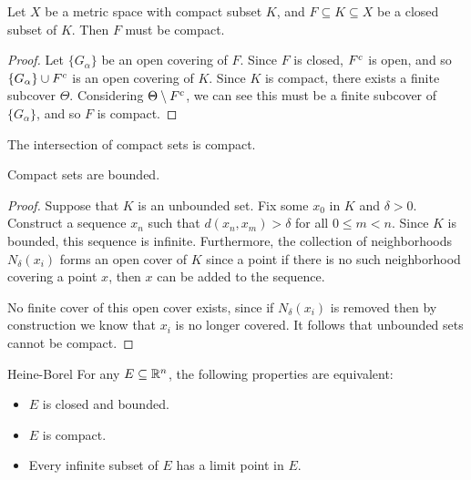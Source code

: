 \begin{thm}\label{thm:closed-subsets-are-compact}
    Let $X$ be a metric space with compact subset $K$, and $F \subseteq K \subseteq X$ be a closed subset of $K$. Then $F$ must be compact.
\end{thm}

\begin{proof}
    Let $\{G_{\alpha}\}$ be an open covering of $F$. Since $F$ is closed, $F^{c}$ is open, and so $\{G_{\alpha}\} \cup F^{c}$ is an open covering of $K$. Since $K$ is compact, there exists a finite subcover $\Theta$. Considering $\Theta \setminus F^{c}$, we can see this must be a finite subcover of $\{G_{\alpha}\}$, and so $F$ is compact.
\end{proof}

\begin{cor}
    The intersection of compact sets is compact.
\end{cor}

\begin{prop}
    Compact sets are bounded.
\end{prop}

\begin{proof}
    Suppose that $K$ is an unbounded set. Fix some $x_0$ in $K$ and $\delta > 0$. Construct a sequence $x_n$ such that $d(x_n, x_m) > \delta$ for all $0 \leq m < n$. Since $K$ is bounded, this sequence is infinite. Furthermore, the collection of neighborhoods $N_{\delta}(x_i)$ forms an open cover of $K$ since a point if there is no such neighborhood covering a point $x$, then $x$ can be added to the sequence.

    No finite cover of this open cover exists, since if $N_{\delta}(x_i)$ is removed then by construction we know that $x_i$ is no longer covered. It follows that unbounded sets cannot be compact.
\end{proof}

\begin{thm}{Heine-Borel}\label{thm:heine-borel}\proofbreak
    For any $E \subseteq \mathbb{R}^{n}$, the following properties are equivalent:
    \begin{itemize}
        \item $E$ is closed and bounded.
        \item $E$ is compact.
        \item Every infinite subset of $E$ has a limit point in $E$.
    \end{itemize}
\end{thm}

